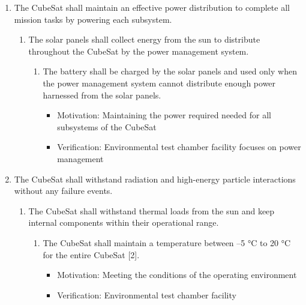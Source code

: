 \begin{enumerate}
\begin{enumerate}
\begin{enumerate}
\begin{itemize}
                \item Verification: Installation and setup of software decoding package, executing transmit from onboard CubeSat while on the ground, and ensuring the signal is received properly \cite{CSS}. 
            \end{itemize}
        \end{enumerate}
    \end{enumerate} %
    \item The CubeSat shall maintain an effective power distribution to complete all mission tasks by powering each subsystem. 
    \begin{enumerate}
        \item The solar panels shall collect energy from the sun to distribute throughout the CubeSat by the power management system.
        \begin{enumerate}
            \item The battery shall be charged by the solar panels and used only when the power management system cannot distribute enough power harnessed from the solar panels. 
                \begin{itemize}
                    \item Motivation: Maintaining the power required needed for all subsystems of the CubeSat
                    \item Verification: Environmental test chamber facility focuses on power management
                \end{itemize}
        \end{enumerate}
    \end{enumerate} %
    \item The CubeSat shall withstand radiation and high-energy particle interactions without any failure events. 
    \begin{enumerate}
        \item The CubeSat shall withstand thermal loads from the sun and keep internal components within their operational range. 
        \begin{enumerate}
            \item The CubeSat shall maintain a temperature between –5 °C to 20 °C for the entire CubeSat [2].  
                \begin{itemize}
                    \item Motivation: Meeting the conditions of the operating environment
                    \item Verification: Environmental test chamber facility 

\end{itemize}
\end{enumerate}
\end{enumerate}
\end{enumerate}
